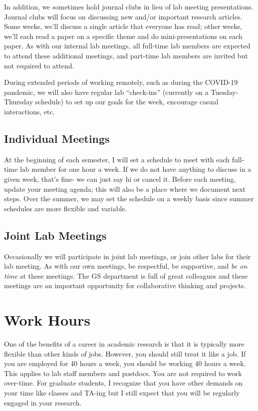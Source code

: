 \documentclass[
]{book}
\begin{document}
In addition, we sometimes hold journal clubs in lieu of lab meeting presentations. Journal clubs will focus on discussing new and/or important research articles. Some weeks, we'll discuss a single article that everyone has read; other weeks, we'll each read a paper on a specific theme and do mini-presentations on each paper. As with our internal lab meetings, all full-time lab members are expected to attend these additional meetings, and part-time lab members are invited but not required to attend.

During extended periods of working remotely, such as during the COVID-19 pandemic, we will also have regular lab ``check-ins'' (currently on a Tuesday-Thursday schedule) to set up our goals for the week, encourage casual interactions, etc.

\hypertarget{individual-meetings}{%
\subsection{Individual Meetings}\label{individual-meetings}}

At the beginning of each semester, I will set a schedule to meet with each full-time lab member for one hour a week. If we do not have anything to discuss in a given week, that's fine- we can just say hi or cancel it. Before each meeting, update your meeting agenda; this will also be a place where we document next steps. Over the summer, we may set the schedule on a weekly basis since summer schedules are more flexible and variable.

\hypertarget{joint-lab-meetings}{%
\subsection{Joint Lab Meetings}\label{joint-lab-meetings}}

Occasionally we will participate in joint lab meetings, or join other labs for their lab meeting. As with our own meetings, be respectful, be supportive, and \emph{be on time} at these meetings. The GS department is full of great colleagues and these meetings are an important opportunity for collaborative thinking and projects.

\hypertarget{work-hours}{%
\section{Work Hours}\label{work-hours}}

One of the benefits of a career in academic research is that it is typically more flexible than other kinds of jobs. However, you should still treat it like a job. If you are employed for 40 hours a week, you should be working 40 hours a week. This applies to lab staff members and postdocs. You are not required to work over-time. For graduate students, I recognize that you have other demands on your time like classes and TA-ing but I still expect that you will be regularly engaged in your research.
\end{document}
